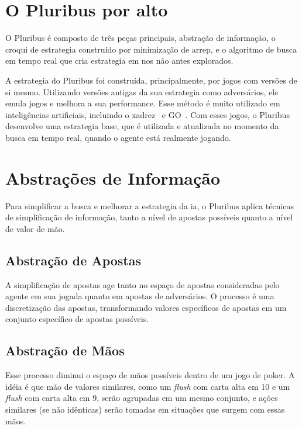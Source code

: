 \documentclass[twocolumn]{article}
\theoremstyle{mytheoremstyle}
\theoremstyle{mytheoremstyle}
\theoremstyle{myproblemstyle}
\begin{document}

    \section{O Pluribus por alto} %
    \label{sec:O Pluribus por alto}
        O Pluribus é composto de três peças principais, abstração de informação, o croqui de \gls{estrategia} construído por minimização de \gls{arrep},
        e o algoritmo de busca em tempo real que cria \gls{estrategia} em \glspl{no} não antes explorados.

        A \gls{estrategia} do Pluribus foi construída, principalmente, por jogos com versões de si mesmo. Utilizando versões antigas
        da sua \gls{estrategia} como adversários, ele emula jogos e melhora a sua performance.
        Esse método é muito utilizado em inteligências
        artificiais, incluindo o xadrez~\cite{DBLP:journals/corr/abs-1712-01815} e GO~\cite{Silver2016}. Com esses jogos, o Pluribus desenvolve uma \gls{estrategia}
        base, que é utilizada e atualizada no momento da busca em tempo real, quando o agente está realmente jogando.

    \section{Abstrações de Informação } %
    \label{sec:Simplificação de Informação }
        Para simplificar a busca e melhorar a \gls{estrategia} da \acrshort{ia}, o Pluribus aplica técnicas de simplificação de informação, tanto a nível de apostas
        possíveis quanto a nível de valor de mão.

        \subsection{Abstração de Apostas} %
        \label{sub:Simplificação de Apostas}

            A simplificação de apostas age tanto no espaço de apostas consideradas pelo agente em sua jogada quanto em apostas de adversários. O processo
            é uma discretização das apostas, transformando valores específicos de apostas em um conjunto específico de apostas possíveis.


        \subsection{Abstração de Mãos} %
        \label{sub:Simplificação de Mãos}
            Esse processo diminui o espaço de mãos possíveis dentro de um jogo de poker. A idéia é que mão de valores similares, como um \emph{flush}
            com carta alta em 10 e um \emph{\gls{flush}} com carta alta em 9, serão agrupadas em um mesmo conjunto, e ações similares (se não idênticas) serão
            tomadas em situações que surgem com essas mãos.
\end{document}
